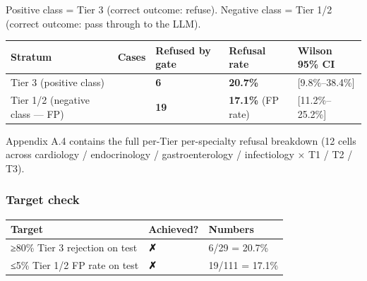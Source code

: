 \documentclass[
  american,
  a4paper,
]{article}
\begin{document}
Positive class = Tier 3 (correct outcome: refuse). Negative class = Tier
1/2 (correct outcome: pass through to the LLM).

\begin{longtable}[]{@{}
  >{\raggedright\arraybackslash}p{}
  >{\raggedright\arraybackslash}p{}
  >{\raggedright\arraybackslash}p{}
  >{\raggedright\arraybackslash}p{}
  >{\raggedright\arraybackslash}p{}@{}}
\toprule\noalign{}
\begin{minipage}[b]{\linewidth}\raggedright
Stratum
\end{minipage} & \begin{minipage}[b]{\linewidth}\raggedright
Cases
\end{minipage} & \begin{minipage}[b]{\linewidth}\raggedright
Refused by gate
\end{minipage} & \begin{minipage}[b]{\linewidth}\raggedright
Refusal rate
\end{minipage} & \begin{minipage}[b]{\linewidth}\raggedright
Wilson 95\% CI
\end{minipage} \\
\midrule\noalign{}
\endhead
\bottomrule\noalign{}
\endlastfoot
Tier 3 (positive class) & 29 & \textbf{6} & \textbf{20.7\%} &
{[}9.8\%--38.4\%{]} \\
Tier 1/2 (negative class --- FP) & 111 & \textbf{19} & \textbf{17.1\%}
(FP rate) & {[}11.2\%--25.2\%{]} \\
\end{longtable}

Appendix A.4 contains the full per-Tier per-specialty refusal breakdown
(12 cells across cardiology / endocrinology / gastroenterology /
infectiology × T1 / T2 / T3).

\subsubsection{Target check}\label{target-check}

\begin{longtable}[]{@{}lll@{}}
\toprule\noalign{}
Target & Achieved? & Numbers \\
\midrule\noalign{}
\endhead
\bottomrule\noalign{}
\endlastfoot
≥80\% Tier 3 rejection on test & \textbf{✗} & 6/29 = 20.7\% \\
≤5\% Tier 1/2 FP rate on test & \textbf{✗} & 19/111 = 17.1\% \\
\end{longtable}
\end{document}

